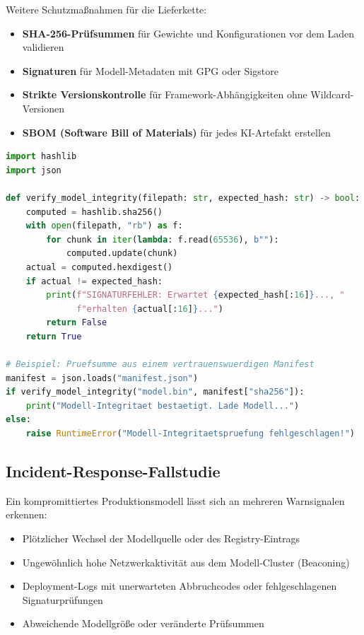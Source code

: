 Weitere Schutzmaßnahmen für die Lieferkette:

\begin{itemize}[leftmargin=*]
    \item \textbf{SHA-256-Prüfsummen} für Gewichte und Konfigurationen vor dem Laden validieren
    \item \textbf{Signaturen} für Modell-Metadaten mit GPG oder Sigstore
    \item \textbf{Strikte Versionskontrolle} für Framework-Abhängigkeiten ohne Wildcard-Versionen
    \item \textbf{SBOM (Software Bill of Materials)} für jedes KI-Artefakt erstellen
\end{itemize}

\begin{lstlisting}[language=Python, caption=Integritätsprüfung: Modell-Gewichte vor dem Laden validieren]
import hashlib
import json

def verify_model_integrity(filepath: str, expected_hash: str) -> bool:
    computed = hashlib.sha256()
    with open(filepath, "rb") as f:
        for chunk in iter(lambda: f.read(65536), b""):
            computed.update(chunk)
    actual = computed.hexdigest()
    if actual != expected_hash:
        print(f"SIGNATURFEHLER: Erwartet {expected_hash[:16]}..., "
              f"erhalten {actual[:16]}...")
        return False
    return True

# Beispiel: Pruefsumme aus einem vertrauenswuerdigen Manifest
manifest = json.loads("manifest.json")
if verify_model_integrity("model.bin", manifest["sha256"]):
    print("Modell-Integritaet bestaetigt. Lade Modell...")
else:
    raise RuntimeError("Modell-Integritaetspruefung fehlgeschlagen!")
\end{lstlisting}

\subsection{Incident-Response-Fallstudie}

Ein kompromittiertes Produktionsmodell lässt sich an mehreren Warnsignalen erkennen:

\begin{itemize}[leftmargin=*]
    \item Plötzlicher Wechsel der Modellquelle oder des Registry-Eintrags
    \item Ungewöhnlich hohe Netzwerkaktivität aus dem Modell-Cluster (Beaconing)
    \item Deployment-Logs mit unerwarteten Abbruchcodes oder fehlgeschlagenen Signaturprüfungen
    \item Abweichende Modellgröße oder veränderte Prüfsummen
\end{itemize}

